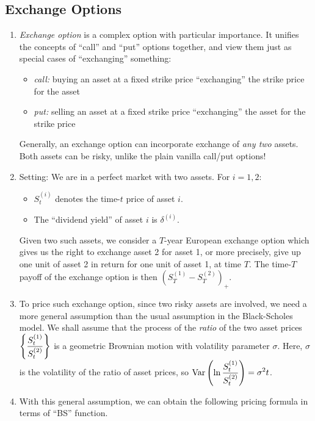 \subsection{Exchange Options}
\label{subsect:exchange-opt}
\begin{enumerate}
\item \emph{Exchange option} is a complex option with particular importance. It
unifies the concepts of ``call'' and ``put'' options together, and view them
just as special cases of ``exchanging'' something:
\begin{itemize}
\item \emph{call:} buying an asset at a fixed strike price
 ``exchanging'' the strike price  for the asset
\item \emph{put:} selling an asset at a fixed strike price
 ``exchanging'' the asset for the strike price 
\end{itemize}
Generally, an exchange option can incorporate exchange of \emph{any two}
assets. Both assets can be risky, unlike the plain vanilla call/put options!

\item Setting: We are in a perfect market with two assets. For \(i=1,2\):
\begin{itemize}
\item \(S_t^{(i)}\) denotes the time-\(t\) price of asset \(i\).
\item The ``dividend yield'' of asset \(i\) is \(\delta^{(i)}\).
\end{itemize}
Given two such assets, we consider a \(T\)-year European exchange option which
gives us the right to exchange asset 2 for asset 1, or more precisely, give up
one unit of asset 2 in return for one unit of asset 1, at time \(T\). The
time-\(T\) payoff of the exchange option is then \((S_T^{(1)}-S_T^{(2)})_{+}\).

\item \label{it:ex-opt-assum} To price such exchange option, since two risky assets are involved, we
need a more general assumption than the usual assumption in the Black-Scholes
model. We shall assume that the process of the \emph{ratio} of the two asset
prices \(\displaystyle \qty{\frac{S_t^{(1)}}{S_t^{(2)}}}\) is a geometric
Brownian motion with volatility parameter \(\sigma\). Here, \(\sigma\) is the
volatility of the ratio of asset prices, so
\(\displaystyle \operatorname{Var}\qty(\ln\frac{S_t^{(1)}}{S_t^{(2)}})=\sigma^2 t\).

\item With this general assumption, we can obtain the following pricing formula
in terms of ``BS'' function.


\end{enumerate}
